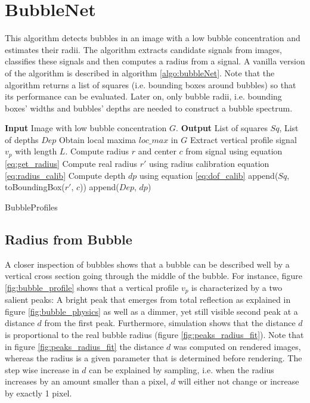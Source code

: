 		
		
		
	\section{BubbleNet}\label{BubbleNet}
	
	This algorithm detects bubbles in an image with a low bubble concentration and estimates their radii. The algorithm extracts candidate signals from images, classifies these signals and then computes a radius from a signal. A vanilla version of the algorithm is described in algorithm \ref{algo:bubbleNet}. Note that the algorithm returns a list of squares (i.e. bounding boxes around bubbles) so that its performance can be evaluated. Later on, only bubble radii, i.e. bounding boxes' widths and bubbles' depths are needed to construct a bubble spectrum. 
	
			\begin{algorithm}
			\begin{algorithmic}[1]
				\State \textbf{Input} Image with low bubble concentration $G$. 
				\State \textbf{Output} List of squares $Sq$, List of depths $Dep$
				\State Obtain local maxima $loc\_max$ in $G$
					\State Extract vertical profile signal $v_p$ with length $L$.
						\State Compute radius $r$ and center $c$ from signal using equation \ref{eq:get_radius}
						\State Compute real radius $r'$ using radius calibration equation \ref{eq:radius_calib}
						\State Compute depth $dp$ using equation \ref{eq:dof_calib}
						\State append($Sq$, toBoundingBox($r'$, $c$))
						\State append($Dep$, $dp$)
					\EndIf
				\EndFor
			\end{algorithmic}
			
			\caption{BubbleProfiles}
			\label{algo:bubbleNet}
		\end{algorithm}
	
	\subsection{Radius from Bubble}
	
	A closer inspection of bubbles shows that a bubble can be described well by a vertical cross section going through the middle of the bubble. For instance, figure \ref{fig:bubble_profile} shows that a vertical profile $v_p$ is characterized by a two salient peaks: A bright peak that emerges from total reflection as explained in figure \ref{fig:bubble_physics} as well as a dimmer, yet still visible second peak at a distance $d$ from the first peak. Furthermore, simulation shows that the distance $d$ is proportional to the real bubble radius (figure \ref{fig:peaks_radius_fit}). Note that in figure \ref{fig:peaks_radius_fit} the distance $d$ was computed on rendered images, whereas the radius is a given parameter that is determined before rendering. The step wise increase in $d$ can be explained by sampling, i.e. when the radius increases by an amount smaller than a pixel, $d$ will either not change or increase by exactly 1 pixel.
	
